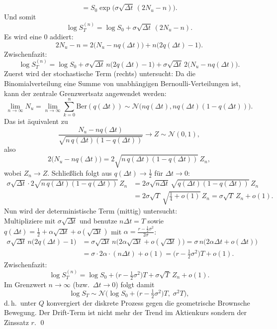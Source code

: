 \begin{satz}
$$= S_0 \exp\!\big(\sigma \sqrt{\Delta t}\,(2N_u - n)\big).
$$
Und somit
$$
\log S_T^{(n)}
= \log S_0 + \sigma \sqrt{\Delta t}\,(2N_u - n).
$$
Es wird eine 0 addiert:
$$
2N_u - n
= 2\big(N_u - n q(\Delta t)\big) + n\big(2q(\Delta t)-1\big).
$$
Zwischenfazit:
$$
\log S_T^{(n)}
= \log S_0 + \sigma \sqrt{\Delta t}\, n\big(2q(\Delta t)-1\big)
+ \sigma \sqrt{\Delta t}\, 2\big(N_u - n q(\Delta t)\big).
$$
Zuerst wird der stochastische Term (rechts) untersucht: Da die Binomialverteilung eine Summe von unabhängigen Bernoulli-Verteilungen ist, kann der zentrale Grenzwertsatz angewendet werden:
$$
\lim_{n\to\infty} N_u = \lim_{n \to \infty} \sum_{k=0}^{n}\text{Ber}(q(\Delta t)) \sim \mathcal N\big(n q(\Delta t), n q(\Delta t)(1-q(\Delta t))\big).
$$
Das ist äquivalent zu
$$
\frac{N_u - n q(\Delta t)}{\sqrt{n\,q(\Delta t)(1-q(\Delta t))}} \longrightarrow Z\sim \mathcal N(0,1),
$$
also
$$
2\big(N_u - n q(\Delta t)\big) = 2\sqrt{n\,q(\Delta t)(1-q(\Delta t))}\,Z_n,
$$
wobei $Z_n\longrightarrow Z$.
Schließlich folgt aus $q(\Delta t)\to \tfrac12$ für $\Delta t\to 0$:
$$
\begin{aligned}
\sigma \sqrt{\Delta t}\cdot 2\sqrt{n\,q(\Delta t)(1-q(\Delta t))}\,Z_n
&= 2\sigma \sqrt{n\Delta t}\,\sqrt{q(\Delta t)(1-q(\Delta t))}\,Z_n \\
&= 2\sigma \sqrt{T}\,\sqrt{\tfrac14 + o(1)}\,Z_n
= \sigma \sqrt{T}\,Z_n + o(1).
\end{aligned}
$$
Nun wird der deterministische Term (mittig) untersucht:
\\ Multipliziere mit $\sigma \sqrt{\Delta t}$ und benutze $n\Delta t=T$ sowie $q(\Delta t)=\tfrac12 + \alpha \sqrt{\Delta t} + o(\sqrt{\Delta t})$ mit
$\alpha=\frac{r-\frac12\sigma^2}{2\sigma}$:
$$
\begin{aligned}
\sigma \sqrt{\Delta t}\, n\big(2q(\Delta t)-1\big)
&= \sigma \sqrt{\Delta t}\, n\big(2\alpha \sqrt{\Delta t} + o(\sqrt{\Delta t})\big)
= \sigma\, n \big(2\alpha \Delta t + o(\Delta t)\big) \\
&= \sigma \cdot 2\alpha \cdot (n\Delta t) + o(1)
= \big(r - \tfrac12 \sigma^2\big)T + o(1).
\end{aligned}
$$
Zwischenfazit:
$$
\log S_T^{(n)}
= \log S_0 + \big(r - \tfrac12 \sigma^2\big)T + \sigma \sqrt{T}\,Z_n + o(1).
$$
Im Grenzwert $n\to\infty$ (bzw.\ $\Delta t \to 0$) folgt damit
$$
\log S_T \sim \mathcal N\!\Big(\log S_0 + \big(r - \tfrac12 \sigma^2\big)T,\;\sigma^2 T\Big),
$$
d.\,h.\ unter $Q$ konvergiert der diskrete Prozess gegen die geometrische Brownsche Bewegung. Der Drift-Term ist nicht mehr der
Trend im Aktienkurs sondern der Zinssatz $r$.
\qed
\end{satz}

